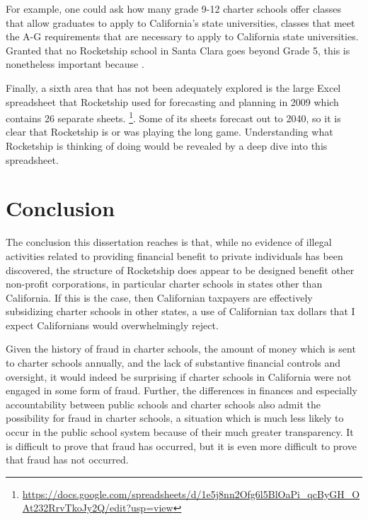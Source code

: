 For example, one could ask how many grade 9-12 charter schools offer classes that allow graduates to apply to California's state universities, classes that meet the A-G requirements that are necessary to apply to California state universities. Granted that no Rocketship school in Santa Clara goes beyond Grade 5, this is nonetheless important because . 

Finally, a sixth area that has not been adequately explored is the large Excel spreadsheet that Rocketship used for forecasting and planning in 2009 which contains 26 separate sheets. \footnote{\url{https://docs.google.com/spreadsheets/d/1e5j8nn2Ofg6l5BlOaPi_qcByGH_OAt232RrvTkoJy2Q/edit?usp=view}}. Some of its sheets forecast out to 2040, so it is clear that Rocketship is or was playing the long game. Understanding what Rocketship is thinking of doing would be revealed by a deep dive into this spreadsheet.

\section{Conclusion}%
\label{sec:conclusion}\indent%

The conclusion this dissertation reaches is that, while no evidence of illegal activities related to providing financial benefit to private individuals has been discovered, the structure of Rocketship does appear to be designed benefit other non-profit corporations, in particular charter schools in states other than California. If this is the case, then Californian taxpayers are effectively subsidizing charter schools in other states, a use of Californian tax dollars that I expect Californians would overwhelmingly reject.

Given the history of fraud in charter schools, the amount of money which is sent to charter schools annually, and the lack of substantive financial controls and oversight, it would indeed be surprising if charter schools in California were not engaged in some form of fraud. Further, the differences in finances and especially accountability between public schools and charter schools also admit the possibility for fraud in charter schools, a situation which is much less likely to occur in the public school system because of their much greater transparency. It is difficult to prove that fraud has occurred, but it is even more difficult to prove that fraud has not occurred. 

